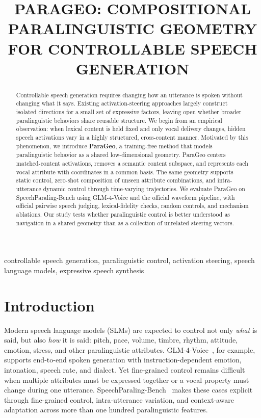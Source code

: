 \documentclass{article}
\title{PARAGEO: COMPOSITIONAL PARALINGUISTIC GEOMETRY FOR CONTROLLABLE SPEECH GENERATION}
\begin{document}
\maketitle

\begin{abstract}
Controllable speech generation requires changing how an utterance is spoken without changing what it says. Existing activation-steering approaches largely construct isolated directions for a small set of expressive factors, leaving open whether broader paralinguistic behaviors share reusable structure. We begin from an empirical observation: when lexical content is held fixed and only vocal delivery changes, hidden speech activations vary in a highly structured, cross-content manner. Motivated by this phenomenon, we introduce \textbf{ParaGeo}, a training-free method that models paralinguistic behavior as a shared low-dimensional geometry. ParaGeo centers matched-content activations, removes a semantic content subspace, and represents each vocal attribute with coordinates in a common basis. The same geometry supports static control, zero-shot composition of unseen attribute combinations, and intra-utterance dynamic control through time-varying trajectories. We evaluate ParaGeo on SpeechParaling-Bench using GLM-4-Voice and the official waveform pipeline, with official pairwise speech judging, lexical-fidelity checks, random controls, and mechanism ablations. Our study tests whether paralinguistic control is better understood as navigation in a shared geometry than as a collection of unrelated steering vectors.
\end{abstract}

\begin{keywords}
controllable speech generation, paralinguistic control, activation steering, speech language models, expressive speech synthesis
\end{keywords}

\section{Introduction}
Modern speech language models (SLMs) are expected to control not only \emph{what} is said, but also \emph{how} it is said: pitch, pace, volume, timbre, rhythm, attitude, emotion, stress, and other paralinguistic attributes. GLM-4-Voice~\cite{zeng2024glm4voice}, for example, supports end-to-end spoken generation with instruction-dependent emotion, intonation, speech rate, and dialect. Yet fine-grained control remains difficult when multiple attributes must be expressed together or a vocal property must change during one utterance. SpeechParaling-Bench~\cite{liu2026speechparaling} makes these cases explicit through fine-grained control, intra-utterance variation, and context-aware adaptation across more than one hundred paralinguistic features.
\end{document}
